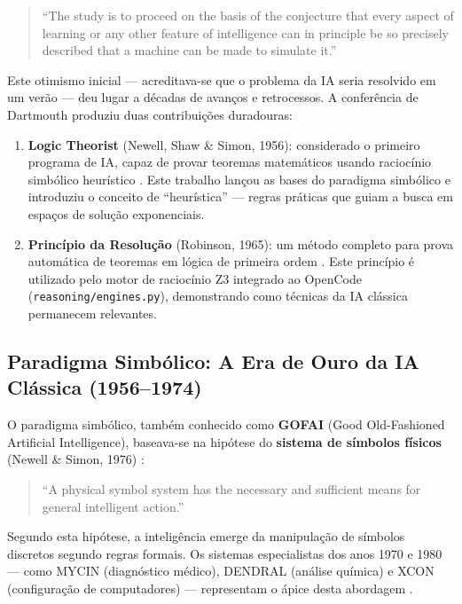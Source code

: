 \begin{quote}
``The study is to proceed on the basis of the conjecture that every aspect of learning or any other feature of intelligence can in principle be so precisely described that a machine can be made to simulate it.''
\end{quote}

Este otimismo inicial --- acreditava-se que o problema da IA seria resolvido em um verão --- deu lugar a décadas de avanços e retrocessos. A conferência de Dartmouth produziu duas contribuições duradouras:

\begin{enumerate}
    \item \textbf{Logic Theorist} (Newell, Shaw \& Simon, 1956): considerado o primeiro programa de IA, capaz de provar teoremas matemáticos usando raciocínio simbólico heurístico \cite{newell1956logic}. Este trabalho lançou as bases do paradigma simbólico e introduziu o conceito de ``heurística'' --- regras práticas que guiam a busca em espaços de solução exponenciais.
    \item \textbf{Princípio da Resolução} (Robinson, 1965): um método completo para prova automática de teoremas em lógica de primeira ordem \cite{robinson1965machine}. Este princípio é utilizado pelo motor de raciocínio Z3 integrado ao OpenCode (\texttt{reasoning/engines.py}), demonstrando como técnicas da IA clássica permanecem relevantes.
\end{enumerate}

\subsection{Paradigma Simbólico: A Era de Ouro da IA Clássica (1956--1974)}

O paradigma simbólico, também conhecido como \textbf{GOFAI} (Good Old-Fashioned Artificial Intelligence), baseava-se na hipótese do \textbf{sistema de símbolos físicos} (Newell \& Simon, 1976) \cite{newell1976computer}:

\begin{quote}
``A physical symbol system has the necessary and sufficient means for general intelligent action.''
\end{quote}

Segundo esta hipótese, a inteligência emerge da manipulação de símbolos discretos segundo regras formais. Os sistemas especialistas dos anos 1970 e 1980 --- como MYCIN (diagnóstico médico), DENDRAL (análise química) e XCON (configuração de computadores) --- representam o ápice desta abordagem \cite{buchanan1984rule}.


